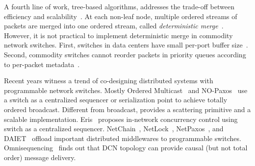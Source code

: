 A fourth line of work, tree-based algorithms, addresses the trade-off between efficiency and scalability~\cite{rodrigues1998scalable}.
At each non-leaf node, multiple ordered streams of packets are merged into one ordered stream, called \textit{deterministic merge}~\cite{hadzilacos1994modular,aguilera2000efficient}.
However, it is not practical to implement deterministic merge in commodity network switches.
First, switches in data centers have small per-port buffer size~\cite{bai2017congestion}.
Second, commodity switches cannot reorder packets in priority queues according to per-packet metadata~\cite{sivaraman2016programmable,jin2018netchain}.


Recent years witness a trend of co-designing distributed systems with programmable network switches.
Mostly Ordered Multicast~\cite{ports2015designing} and NO-Paxos~\cite{li2016just} use a switch as a centralized sequencer or serialization point to achieve totally ordered broadcast.
Different from broadcast, \sys{} provides a scattering primitive and a scalable implementation.
Eris~\cite{eris} proposes in-network concurrency control using switch as a centralized sequencer.
NetChain~\cite{jin2018netchain}, NetLock~\cite{yu2020netlock}, NetPaxos~\cite{dang2015netpaxos}, and DAIET~\cite{sapio2017network} offload important distributed middlewares to programmable switches.
Omnisequencing~\cite{michael2018towards} finds out that DCN topology can provide causal (but not total order) message delivery.







